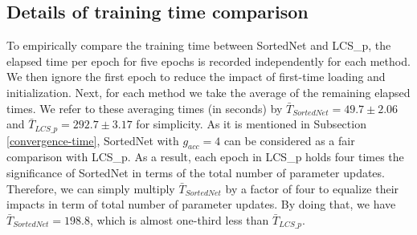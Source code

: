 \documentclass[letterpaper]{article} %
\begin{document}
\subsection{Details of training time comparison}
\label{apdx:running-time}
To empirically compare the training time between SortedNet and LCS\_p, the elapsed time per epoch for five epochs is recorded independently for each method. We then ignore the first epoch to reduce the impact of first-time loading and initialization. Next, for each method we take the average of the remaining elapsed times. We refer to these averaging times (in seconds) by $\bar{T}_{SortedNet}=49.7 \pm 2.06$ and $\bar{T}_{LCS\_p}=292.7 \pm 3.17$ for simplicity. As it is mentioned in Subsection \ref{convergence-time}, SortedNet with $g_{acc}=4$ can be considered as a fair comparison with LCS\_p. As a result, each epoch in LCS\_p holds four times the significance of SortedNet in terms of the total number of parameter updates. Therefore, we can simply multiply $\bar{T}_{SortedNet}$ by a factor of four to equalize their impacts in term of total number of parameter updates. By doing that, we have $\bar{T}_{SortedNet}=198.8$, which is almost one-third less than $\bar{T}_{LCS\_p}$.
\end{document}
